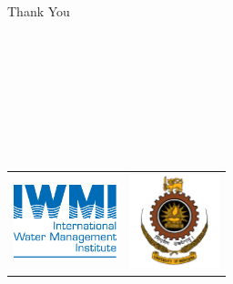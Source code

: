 \documentclass[xcolor=dvipsnames,beamer]{beamer} %
\begin{document}
\begin{frame}[fragile]{Thank You}

\ \\
\ \\
\ \\
\ \\
\ \\
\ \\
\ 
\begin{center}
\begin{tabular}{ll}
\includegraphics[width=3cm]{iwmi} & \includegraphics[width=2.6cm]{mrt}\\
\end{tabular}
\end{center}

\end{frame}
\end{document}
